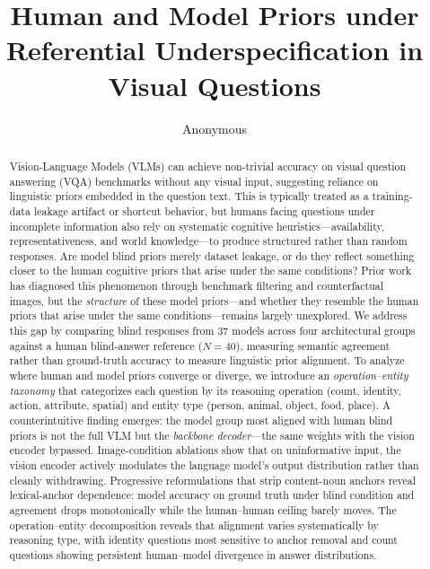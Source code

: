 \documentclass[letterpaper]{article}
\title{Human and Model Priors under Referential Underspecification in Visual Questions}
\author{Anonymous}
\begin{document}
\maketitle


\begin{abstract} 
Vision-Language Models (VLMs) can achieve non-trivial accuracy on visual
question answering (VQA) benchmarks without any visual input, suggesting
reliance on linguistic priors embedded in the question text. This is
typically treated as a training-data leakage artifact or shortcut
behavior, but humans facing questions under incomplete information also
rely on systematic cognitive heuristics---availability,
representativeness, and world knowledge---to produce structured rather
than random responses. Are model blind priors merely dataset leakage, or
do they reflect something closer to the human cognitive priors that
arise under the same conditions? Prior work has diagnosed this phenomenon through benchmark
filtering and counterfactual images, but the \emph{structure} of these
model priors---and whether they resemble the human priors that arise
under the same conditions---remains largely unexplored.
We address this gap by comparing blind responses from 37 models across
four architectural groups against a human blind-answer reference
($N{=}40$), measuring semantic agreement rather than ground-truth accuracy to measure linguistic prior alignment. %
To analyze where human and model priors converge or diverge, we introduce an \emph{operation--entity taxonomy} that categorizes each
question by its reasoning operation (count, identity, action, attribute,
spatial) and entity type (person, animal, object, food, place).
A counterintuitive finding emerges: the model group most aligned with
human blind priors is not the full VLM but the \emph{backbone
decoder}---the same weights with the vision encoder bypassed.
Image-condition ablations show that on uninformative input, the vision
encoder actively modulates the language model's output distribution
rather than cleanly withdrawing.
Progressive reformulations that strip content-noun anchors reveal
lexical-anchor dependence: model accuracy on ground truth under blind condition and agreement drops monotonically while the human--human ceiling barely moves. The operation--entity decomposition reveals that alignment
varies systematically by reasoning type, with identity questions most
sensitive to anchor removal and count questions showing persistent
human--model divergence in answer distributions.
\end{abstract}
\end{document}
